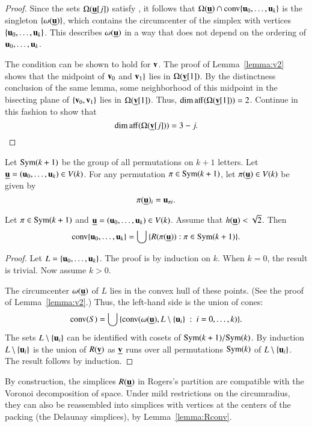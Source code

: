 \begin{proof} 
Since the sets $\Omega({\underline{{\mathbf u}}}[j])$ satisfy , it follows that
$\Omega({\underline{{\mathbf u}}})\cap {\operatorname{conv}}\{ {\mathbf u}_0,\ldots, {\mathbf u}_k\}$ is the singleton $\{\omega({\underline{{\mathbf u}}})\}$, which contains the
circumcenter of the simplex with vertices $\{ {\mathbf u}_0,\ldots, {\mathbf u}_k\}$.  This describes $\omega({\underline{{\mathbf u}}})$ in a way that does not depend on the ordering of $ {\mathbf u}_0,\ldots, {\mathbf u}_k$.

The condition  can be shown to hold for ${\mathbf v}$.
The proof of Lemma~\ref{lemma:v2} shows that the midpoint of ${\mathbf v}_0$ and ${\mathbf v}_1\}$
lies in $\Omega({\underline{{\mathbf v}}}[1])$.  By the distinctness conclusion of the same lemma, some neighborhood
of this midpoint in the bisecting plane of $\{{\mathbf v}_0,{\mathbf v}_1\}$ lies in $\Omega({\underline{{\mathbf v}}}[1])$.
Thus, $\operatorname{dim\,aff}(\Omega({\underline{{\mathbf v}}}[1]))=2$.  Continue in this fashion to show that 
$$
\operatorname{dim\,aff}(\Omega({\underline{{\mathbf v}}}[j]))=3-j.$$
\end{proof}

Let
${\operatorname{Sym}}(k+1)$ be the group of all permutations on $k+1$ letters.
Let ${\underline{{\mathbf u}}} = ( {\mathbf u}_0,\ldots, {\mathbf u}_k)\in V(k)$.  
For any permutation $\pi\in{\operatorname{Sym}}(k+1)$, let $\pi({\underline{{\mathbf u}}})\in V(k)$ be given by
$$
\pi({\underline{{\mathbf u}}})_i =  {\mathbf u}_{\pi i}.
$$   

\begin{lemma}\label{lemma:Rconv}  Let $\pi\in{\operatorname{Sym}}(k+1)$
and ${\underline{{\mathbf u}}} = ( {\mathbf u}_0,\ldots, {\mathbf u}_k)\in V(k)$.  
Assume that $h({\underline{{\mathbf u}}})<\sqrt2$. Then
$$
{\operatorname{conv}}\{ {\mathbf u}_0,\ldots, {\mathbf u}_k\} = \bigcup \,\{ R(\pi({\underline{{\mathbf u}}})) : \pi\in {\operatorname{Sym}}(k+1)\}.
$$
\end{lemma}
%

\begin{proof} Let $L = \{ {\mathbf u}_0,\ldots, {\mathbf u}_k\}$.  The proof is by induction on $k$.
When $k=0$, the result is trivial.  Now assume $k>0$.

The circumcenter $\omega({\underline{{\mathbf u}}})$ of $L$ lies in the convex hull of these
points.  (See the proof of Lemma~\ref{lemma:v2}.)  Thus, the left-hand side is the union
of cones:
$$
{\operatorname{conv}}(S) = \bigcup\,\{ {\operatorname{conv}}(\omega({\underline{{\mathbf u}}}),L\setminus \{ {\mathbf u}_i\}\ :\  i=0,\ldots,k) \}.
$$
The sets $L\setminus \{ {\mathbf u}_i\}$ can be identified with  cosets of ${\operatorname{Sym}}(k+1) /{\operatorname{Sym}}(k)$.
By induction $L\setminus \{ {\mathbf u}_i\}$ is the union of $R({\underline{{\mathbf v}}})$ as ${\underline{{\mathbf v}}}$ runs
over all permutations ${\operatorname{Sym}}(k)$ of $L\setminus \{ {\mathbf u}_i\}$.
The result follows by induction.
\end{proof}

By construction, the simplices $R({\underline{{\mathbf u}}})$ in Rogers's partition  are compatible with the Voronoi
decomposition of space.  Under
mild restrictions on the circumradius, they can also be reassembled into simplices
with vertices at the centers of the packing (the Delaunay simplices),  by Lemma~\ref{lemma:Rconv}.
%
%

